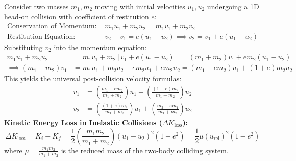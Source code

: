 \documentclass[10pt,a4paper]{article}
\begin{document}
\begin{formulabox}
Consider two masses $m_1, m_2$ moving with initial velocities $u_1, u_2$ undergoing a 1D head-on collision with coefficient of restitution $e$:
\begin{align}
  \text{Conservation of Momentum: } &m_1 u_1 + m_2 u_2 = m_1 v_1 + m_2 v_2 \\
  \text{Restitution Equation: } &v_2 - v_1 = e(u_1 - u_2) \implies v_2 = v_1 + e(u_1 - u_2)
\end{align}
Substituting $v_2$ into the momentum equation:
\begin{align}
  m_1 u_1 + m_2 u_2 &= m_1 v_1 + m_2[v_1 + e(u_1 - u_2)] = (m_1 + m_2)v_1 + e m_2(u_1 - u_2) \nonumber \\
  \implies (m_1 + m_2)v_1 &= m_1 u_1 + m_2 u_2 - e m_2 u_1 + e m_2 u_2 = (m_1 - e m_2)u_1 + (1+e)m_2 u_2
\end{align}
This yields the universal post-collision velocity formulas:
\begin{align}
  v_1 &= \left(\frac{m_1 - e m_2}{m_1 + m_2}\right)u_1 + \left(\frac{(1+e)m_2}{m_1 + m_2}\right)u_2 \\
  v_2 &= \left(\frac{(1+e)m_1}{m_1 + m_2}\right)u_1 + \left(\frac{m_2 - e m_1}{m_1 + m_2}\right)u_2
\end{align}
\textbf{Kinetic Energy Loss in Inelastic Collisions ($\Delta K_{\text{loss}}$):}
\begin{equation}
  \Delta K_{\text{loss}} = K_i - K_f = \frac{1}{2}\left(\frac{m_1 m_2}{m_1 + m_2}\right)(u_1 - u_2)^2(1 - e^2) = \frac{1}{2}\mu (u_{\text{rel}})^2(1 - e^2)
\end{equation}
where $\mu = \frac{m_1 m_2}{m_1 + m_2}$ is the reduced mass of the two-body colliding system.
\end{formulabox}
\end{document}
